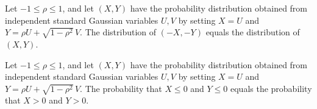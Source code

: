 \begin{theorem}
\label{FABL.correlatedGaussianMeasure_map_neg}
\leanok
{}
Let $-1\leq\rho\leq1$, and let $(X,Y)$ have the probability distribution obtained from
independent standard Gaussian variables $U,V$ by setting $X=U$ and $Y=\rho
U+\sqrt{1-\rho^2}\,V$. The distribution of $(-X,-Y)$ equals the distribution of $(X,Y)$.
\end{theorem}

\begin{theorem}
\label{FABL.correlatedGaussianMeasure_lowerLeft_eq_upperRight}
\leanok
{}
Let $-1\leq\rho\leq1$, and let $(X,Y)$ have the probability distribution obtained from
independent standard Gaussian variables $U,V$ by setting $X=U$ and $Y=\rho
U+\sqrt{1-\rho^2}\,V$. The probability that $X\leq0$ and $Y\leq0$ equals the probability
that $X>0$ and $Y>0$.
\end{theorem}

